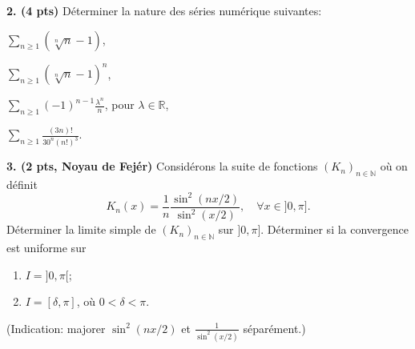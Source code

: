 \documentclass[a4paper,10pt]{article}
\newcommand{\N}{\mathbb{N}}
\newcommand{\R}{\mathbb{R}}
\begin{document}
\noindent
\textbf{2. (4 pts)}
Déterminer la nature des séries numérique suivantes:
\begin{enumerate}[label=\alph*)]
\begin{minipage}{0.4\linewidth}
    \item $\sum_{n\geq1}(\sqrt[n]{n}-1)$,
    \item $\sum_{n\geq1}(\sqrt[n]{n}-1)^n$,
\end{minipage}
\begin{minipage}{0.4\linewidth}
    \item $\sum_{n\geq1}(-1)^{n-1}\frac{\lambda^n}{n}$, pour $\lambda\in\R$,
    \item $\sum_{n\geq1}\frac{(3n)!}{30^n(n!)^3}$.
\end{minipage}
\end{enumerate}

\vspace{.1in}

\noindent
\textbf{3. (2 pts, Noyau de Fejér)} Considérons la suite de fonctions $(K_n)_{n\in\N}$ où on définit
$$K_n(x)=\frac{1}{n}\frac{\sin^2(nx/2)}{\sin^2(x/2)},\quad\forall x\in]0,\pi].$$
Déterminer la limite simple de $(K_n)_{n\in\N}$ sur $]0,\pi]$. Déterminer si la convergence est uniforme sur
\begin{enumerate}[label=\alph*)]
    \item $I=]0,\pi[$;
    \item $I=[\delta,\pi]$, où $0<\delta<\pi$.
\end{enumerate}
(Indication: majorer $\sin^2(nx/2)$ et $\frac{1}{\sin^2(x/2)}$ séparément.)


\end{document}
